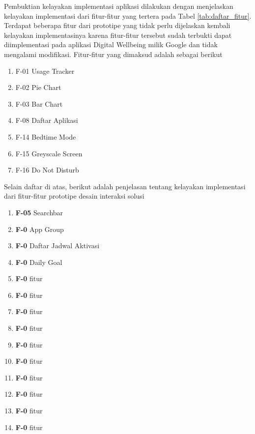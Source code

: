 Pembuktian kelayakan implementasi aplikasi dilakukan dengan menjelaskan kelayakan implementasi dari fitur-fitur yang tertera pada Tabel \ref{tab:daftar_fitur}. Terdapat beberapa fitur dari prototipe yang tidak perlu dijelaskan kembali kelayakan implementasinya karena fitur-fitur tersebut sudah terbukti dapat diimplementasi pada aplikasi Digital Wellbeing milik Google dan tidak mengalami modifikasi. Fitur-fitur yang dimaksud adalah sebagai berikut

\begin{enumerate}
  \item F-01 Usage Tracker
  \item F-02 Pie Chart
  \item F-03 Bar Chart
  \item F-08 Daftar Aplikasi
  \item F-14 Bedtime Mode
  \item F-15 Greyscale Screen
  \item F-16 Do Not Disturb
\end{enumerate}

Selain daftar di atas, berikut adalah penjelasan tentang kelayakan implementasi dari fitur-fitur prototipe desain interaksi solusi

\begin{enumerate}
  \item \textbf{F-05} Searchbar
  \subitem
    
  \item \textbf{F-0} App Group
  \subitem
    
  \item \textbf{F-0} Daftar Jadwal Aktivasi
  \subitem
    
  \item \textbf{F-0} Daily Goal
  \subitem
    
  \item \textbf{F-0} fitur
  \subitem
    
  \item \textbf{F-0} fitur
  \subitem
    
  \item \textbf{F-0} fitur
  \subitem
    
  \item \textbf{F-0} fitur
  \subitem
    
  \item \textbf{F-0} fitur
  \subitem
    
  \item \textbf{F-0} fitur
  \subitem
    
  \item \textbf{F-0} fitur
  \subitem
    
  \item \textbf{F-0} fitur
  \subitem
    
  \item \textbf{F-0} fitur
  \subitem
    
  \item \textbf{F-0} fitur
  \subitem
    
\end{enumerate}